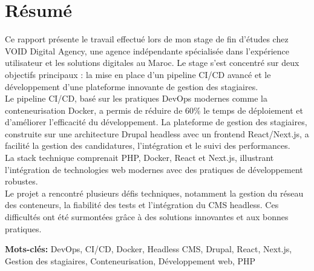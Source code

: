 \chapter*{Résumé}
\thispagestyle{empty}

\vspace*{1cm}

\indent Ce rapport présente le travail effectué lors de mon stage de fin d'études chez VOID Digital Agency, une agence indépendante spécialisée dans l'expérience utilisateur et les solutions digitales au Maroc. Le stage s'est concentré sur deux objectifs principaux : la mise en place d'un pipeline CI/CD avancé et le développement d'une plateforme innovante de gestion des stagiaires.\\[0.5em]

\indent Le pipeline CI/CD, basé sur les pratiques DevOps modernes comme la conteneurisation Docker, a permis de réduire de 60\% le temps de déploiement et d'améliorer l'efficacité du développement. La plateforme de gestion des stagiaires, construite sur une architecture Drupal headless avec un frontend React/Next.js, a facilité la gestion des candidatures, l'intégration et le suivi des performances.\\[0.5em]

\indent La stack technique comprenait PHP, Docker, React et Next.js, illustrant l'intégration de technologies web modernes avec des pratiques de développement robustes.\\[0.5em]

\indent Le projet a rencontré plusieurs défis techniques, notamment la gestion du réseau des conteneurs, la fiabilité des tests et l'intégration du CMS headless. Ces difficultés ont été surmontées grâce à des solutions innovantes et aux bonnes pratiques.

\vspace{1cm}
\textbf{Mots-clés:} DevOps, CI/CD, Docker, Headless CMS, Drupal, React, Next.js, Gestion des stagiaires, Conteneurisation, Développement web, PHP

\clearpage
